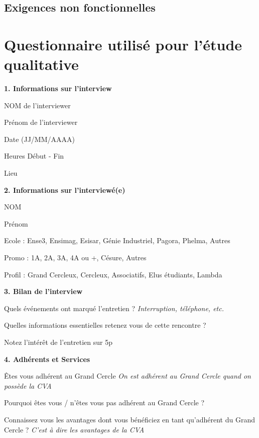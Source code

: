 \documentclass[a4paper, 11px]{article}
\begin{document}
\subsection{Exigences non fonctionnelles}


\appendix
\addappheadtotoc

\newpage

\section{Questionnaire utilisé pour l'étude qualitative}

 \textbf {\large 1. Informations sur l'interview}

	NOM de l'interviewer
	
	Prénom de l'interviewer
	
	Date (JJ/MM/AAAA)
	
	Heures Début - Fin
	
	Lieu

\vspace{.3cm}

 \textbf {\large 2. Informations sur l'interviewé(e)}

	NOM
	
	Prénom
	
	Ecole : 
	 Ense3,
	 Ensimag,
	 Esisar,
	 Génie Industriel,
	 Pagora,
	 Phelma,
	 Autres
	
	Promo :
	 1A,
	 2A,
	 3A,
	 4A ou +,
	 Césure,
	 Autres
	
	Profil : 
	 Grand Cercleux,
	 Cercleux,
	 Associatifs,
	 Elus étudiants,
	 Lambda

\vspace{.3cm}

 \textbf {\large 3. Bilan de l'interview}

Quels événements ont marqué l'entretien ?
\textit{Interruption, téléphone, etc.}

Quelles informations essentielles retenez vous de cette rencontre ?

Notez l'intérêt de l'entretien sur 5p


\vspace{.3cm}

 \textbf {\large 4. Adhérents et Services}

Êtes vous adhérent au Grand Cercle
\textit{On est adhérent au Grand Cercle quand on possède la CVA}

Pourquoi êtes vous / n'êtes vous pas adhérent au Grand Cercle ?

Connaissez vous les avantages dont vous bénéficiez en tant qu'adhérent du Grand Cercle ?
\textit{C'est à dire les avantages de la CVA}
\end{document}

